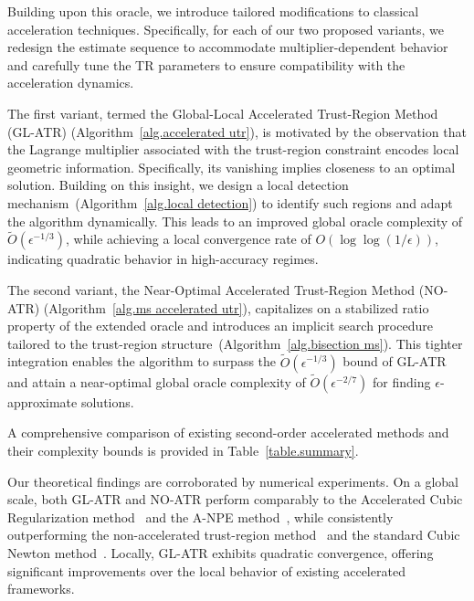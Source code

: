 \documentclass{mcom-l}
\numberwithin{equation}{section}
\begin{document}
Building upon this oracle, we introduce tailored modifications to classical acceleration techniques. Specifically, for each of our two proposed variants, we redesign the estimate sequence to accommodate multiplier-dependent behavior and carefully tune the TR parameters to ensure compatibility with the acceleration dynamics.

The first variant, termed the Global-Local Accelerated Trust-Region Method (GL-ATR) (Algorithm~\ref{alg.accelerated utr}), is motivated by the observation that the Lagrange multiplier associated with the trust-region constraint encodes local geometric information. Specifically, its vanishing implies closeness to an optimal solution. Building on this insight, we design a local detection mechanism~(Algorithm~\ref{alg.local detection}) to identify such regions and adapt the algorithm dynamically. This leads to an improved global oracle complexity of $\tilde{O}(\epsilon^{-1/3})$, while achieving a local convergence rate of $O(\log\log(1/\epsilon))$, indicating quadratic behavior in high-accuracy regimes.

The second variant, the Near-Optimal Accelerated Trust-Region Method (NO-ATR) (Algorithm~\ref{alg.ms accelerated utr}), capitalizes on a stabilized ratio property of the extended oracle and introduces an implicit search procedure tailored to the trust-region structure~(Algorithm~\ref{alg.bisection ms}). This tighter integration enables the algorithm to surpass the $\tilde{O}(\epsilon^{-1/3})$ bound of GL-ATR and attain a near-optimal global oracle complexity of $\tilde{O}(\epsilon^{-2/7})$ for finding $\epsilon$-approximate solutions.

A comprehensive comparison of existing second-order accelerated methods and their complexity bounds is provided in Table~\ref{table.summary}.

Our theoretical findings are corroborated by numerical experiments. On a global scale, both GL-ATR and NO-ATR perform comparably to the Accelerated Cubic Regularization method~\cite{nesterov2008accelerating} and the A-NPE method~\cite{monteiro2013accelerated}, while consistently outperforming the non-accelerated trust-region method~\cite{jiang2024nonconvexityuniversaltrustregionmethod} and the standard Cubic Newton method~\cite{nesterov2006cubic}. Locally, GL-ATR exhibits quadratic convergence, offering significant improvements over the local behavior of existing accelerated frameworks.
\end{document}
